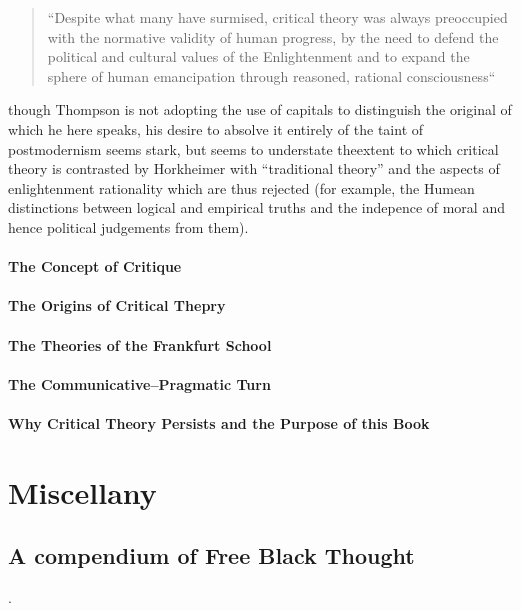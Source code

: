 \documentclass[10pt,titlepage]{book}
\begin{document}
\begin{quotation}
``Despite what many have surmised, critical theory was always preoccupied with the normative validity of human progress, by the need to defend the political and cultural values of the Enlightenment and to expand the sphere of human emancipation through reasoned, rational consciousness``
\end{quotation}

though Thompson is not adopting the use of capitals to distinguish the original of which he here speaks, his desire to absolve it entirely of the taint of postmodernism seems stark, but seems to understate theextent to which critical theory is contrasted by Horkheimer with ``traditional theory'' and the aspects of enlightenment rationality which are thus rejected (for example, the Humean distinctions between logical and empirical truths and the indepence of moral and hence political judgements from them).

\paragraph{The Concept of Critique}

\paragraph{The Origins of Critical Thepry}

\paragraph{The Theories of the Frankfurt School}

\paragraph{The Communicative–Pragmatic Turn}

\paragraph{Why Critical Theory Persists and the Purpose of this Book}

\section{Miscellany}

\subsection{A compendium of Free Black Thought \cite{free-black-thought}}.
\end{document}
